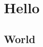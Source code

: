 \documentclass[a4paper,12pt,BCOR=1cm]{scrbook}
\begin{document}
\chapter{Hello}
\section{World}
 
\blindtext[10]
 
\end{document}
